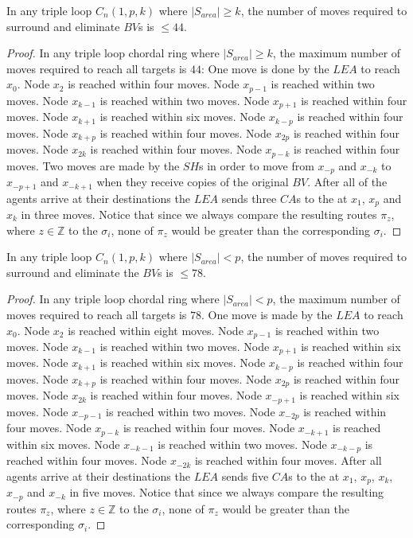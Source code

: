  
 \begin{theorem}
In any triple loop   $C_n(1,p,k)$ where $\left\vert{S_{area}}\right\vert \ge k$, the number of moves required to surround and eliminate $BV$s is $\leq44$.
\end{theorem}
 \begin{proof}
In any triple loop chordal ring where $\left\vert{S_{area}}\right\vert \ge k$, the maximum number of moves required to reach all targets is $44$: One move is done by the $LEA$ to reach $x_0$. Node $x_{2}$ is reached within four moves.
 Node $x_{p-1}$ is reached within two moves.
 Node $x_{k-1}$ is reached within two moves.
 Node $x_{p+1}$ is reached within four moves.
 Node $x_{k+1}$ is reached within six moves.
 Node $x_{k-p}$ is reached within four moves.
  Node $x_{k+p}$ is reached within four moves.
 Node $x_{2p}$ is reached within four moves.
 Node $x_{2k}$ is reached within four moves.
 Node $x_{p-k}$ is reached within four moves.
 Two moves are made by the $SH$s in order to move from $x_{-p}$ and $x_{-k}$ to $x_{-p+1}$ and $x_{-k+1}$  when they receive copies of the original $BV$.
 After all of the agents arrive at their destinations the $LEA$ sends three $CA$s to the \bvs at $x_{1}$, $x_{p}$ and $x_{k}$ in three moves. Notice that since we always compare the resulting routes $\pi_z$, where $z \in \mathbb{Z}$  to the  $\sigma_i$, none of $\pi_z$ would be greater than the corresponding $\sigma_i$. 
\end{proof}

\begin{theorem}
In any triple loop   $C_n(1,p,k)$ where $\left\vert{S_{area}}\right\vert < p$, the number of moves required to surround and eliminate the $BV$s is $\leq78$.
\end{theorem}
 \begin{proof}
In any triple loop chordal ring where $\left\vert{S_{area}}\right\vert <p$, the maximum number of moves required to reach all targets is $78$. One move is made by the $LEA$ to reach $x_0$.
 Node $x_{2}$ is reached within eight moves.
 Node $x_{p-1}$ is reached within two moves.
 Node $x_{k-1}$ is reached within two moves.
 Node $x_{p+1}$ is reached  within six moves.
 Node $x_{k+1}$ is reached within six moves.
 Node $x_{k-p}$ is reached within four moves.
 Node $x_{k+p}$ is reached within four moves.
 Node $x_{2p}$ is reached within four moves.
 Node $x_{2k}$ is reached within four moves.
 Node $x_{-p+1}$ is reached within six moves.
 Node $x_{-p-1}$ is reached within two moves.
 Node $x_{-2p}$ is reached within four moves.
 Node $x_{p-k}$ is reached  within four moves.
 Node $x_{-k+1}$ is reached within six moves.
 Node $x_{-k-1}$ is reached within two moves.
 Node $x_{-k-p}$ is reached within four moves.
 Node $x_{-2k}$ is reached within four moves.
 After all agents arrive at their destinations the $LEA$ sends five $CA$s to the \bvs at $x_{1}$, $x_{p}$, $x_{k}$,$x_{-p}$ and $x_{-k}$ in five moves. Notice that since we always compare the resulting routes $\pi_z$, where $z \in \mathbb{Z}$  to the  $\sigma_i$, none of $\pi_z$ would be greater than the corresponding $\sigma_i$. 
\end{proof}


